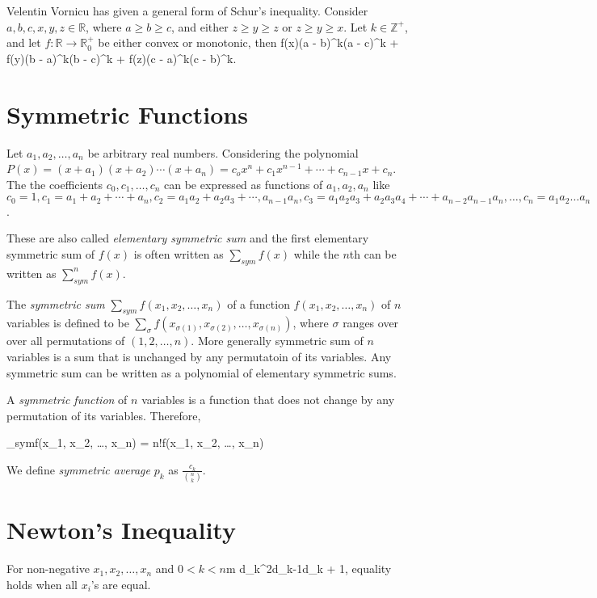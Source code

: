 \noindent Velentin Vornicu has given a general form of Schur's inequality. Consider $a, b, c, x, y, z\in\mathbb{R}$, where $a\geq
b\geq c$, and either $z\geq y\geq z$ or $z\geq y\geq x$. Let $k\in\mathbb{Z}^+$, and let $f:\mathbb{R}\rightarrow\mathbb{R}_0^+$ be
either convex or monotonic, then
\placeformula\startformula
  f(x)(a - b)^k(a - c)^k + f(y)(b - a)^k(b - c)^k + f(z)(c - a)^k(c - b)^k.
\stopformula

\section{Symmetric Functions}
Let $a_1, a_2, \ldots, a_n$ be arbitrary real numbers. Considering the polynomial $P(x) = (x + a_1)(x + a_2)\cdots(x + a_n) =
c_ox^n + c_1x^{n - 1} + \cdots + c_{n-1}x + c_n$. The the coefficients $c_0, c_1, \ldots, c_n$ can be expressed as functions of
$a_1, a_2, a_n$ like $c_0 = 1, c_1 = a_1 + a_2 + \cdots + a_n, c_2 = a_1a_2 + a_2a_3 + \cdots, a_{n-1}a_n, c_3 = a_1a_2a_3 +
a_2a_3a_4 + \cdots + a_{n-2}a_{n-1}a_n, \ldots, c_n = a_1a_2\ldots a_n$.

These are also called {\it elementary symmetric sum} and the first elementary symmetric sum of $f(x)$ is often written as
$\sum_{sym}f(x)$ while the $n$th can be written as $\sum_{sym}^nf(x)$.

The {\it symmetric sum} $\sum_{sym}f(x_1, x_2, \ldots, x_n)$ of a function $f(x_1, x_2, \ldots, x_n)$ of $n$ variables is
defined to be $\sum_{\sigma}f(x_{\sigma(1)}, x_{\sigma(2)}, \ldots, x_{\sigma(n)})$, where $\sigma$ ranges over over all
permutations of $(1, 2, \ldots, n)$. More generally symmetric sum of $n$ variables is a sum that is unchanged by any permutatoin of
its variables. Any symmetric sum can be written as a polynomial of elementary symmetric sums.

A {\it symmetric function} of $n$ variables is a function that does not change by any permutation of its variables. Therefore,

\startformula \sum_{sym}f(x_1, x_2, \ldots, x_n) = n!f(x_1, x_2, \ldots, x_n)\stopformula

We define {\it symmetric average} $p_k$ as $\frac{c_k}{\binom{n}{k}}$.

\section{Newton's Inequality}
\starttheorem
  For non-negative $x_1, x_2, \ldots, x_n$ and $0<k< n$m
  \placeformula\startformula
    d_k^2\geq d_{k-1}d_{k + 1},
  \stopformula
  equality holds when all $x_i$'s are equal.
\stoptheorem

